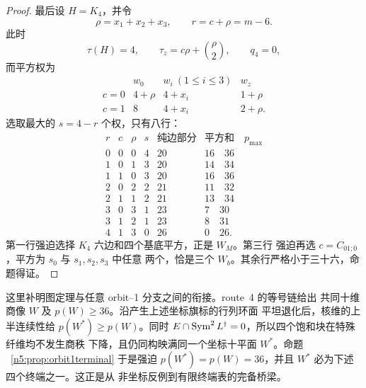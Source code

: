 \begin{proof}
最后设 \(H=K_4\)，并令
\[
 \rho=x_1+x_2+x_3,\qquad r=c+\rho=m-6.
\]
此时
\[
\tau(H)=4,\qquad \tau_z=c\rho+\binom\rho2,\qquad q_4=0,
\]
而平方权为
\[
\begin{array}{c|ccc}
&w_0&w_i\ (1\le i\le3)&w_z\\ \hline
c=0&4+\rho&4+x_i&1+\rho\\
c=1&8&4+x_i&2+\rho.
\end{array}                                                     \tag{T10}
\]
选取最大的 \(s=4-r\) 个权，只有八行：
\[
\begin{array}{c|c|c|c|c|c}
r&c&\rho&s&\text{纯边部分}&\text{平方和}\quad p_{\max}\\ \hline
0&0&0&4&20&16\quad36\\
1&0&1&3&20&14\quad34\\
1&1&0&3&20&16\quad36\\
2&0&2&2&21&11\quad32\\
2&1&1&2&21&13\quad34\\
3&0&3&1&23&7\quad30\\
3&1&2&1&23&8\quad31\\
4&1&3&0&26&0\quad26.
\end{array}                                                     \tag{T11}
\]
第一行强迫选择 \(K_4\) 六边和四个基底平方，正是 \(W_M\)。第三行
强迫再选 \(c=C_{01;0}\)，平方为 \(s_0\) 与 \(s_1,s_2,s_3\) 中任意
两个，恰是三个 \(W_b\)。其余行严格小于三十六，命题得证。
\end{proof}

这里补明图定理与任意 orbit--1 分支之间的衔接。route~4 的等号链给出
共同十维商像 \(W\) 及 \(p(W)\ge36\)。沿产生上述坐标旗标的行列环面
平坦退化后，核维的上半连续性给 \(p(W^*)\ge p(W)\)。同时
\(E\cap\operatorname{Sym}^2L^\dagger=0\)，所以四个饱和块在特殊纤维均不发生商秩
下降，且仍同构映满同一个坐标十平面 \(W^*\)。命题
~\ref{n5:prop:orbit1terminal} 于是强迫
\(p(W^*)=p(W)=36\)，并且 \(W^*\) 必为下述四个终端之一。这正是从
非坐标反例到有限终端表的完备桥梁。

